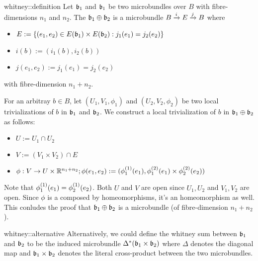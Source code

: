 \begin{mydefinition}{whitney::definition}
    Let $\bb_1$ and $\bb_1$ be two microbundles over $B$ with fibre-dimensions $n_1$ and $n_2$.
    The  $\whitney{\bb_1}{\bb_2}$ is a microbundle $\bundle{B}{E}{i}{j}$ where
    \begin{itemize}
        \item $E := \set{ (e_1, e_2) \in E(\bb_1) \times E(\bb_2)}{j_1(e_1) = j_2(e_2)}$
        \item $i(b) := (i_1(b), i_2(b))$
        \item $j(e_1, e_2) := j_1(e_1) = j_2(e_2)$
    \end{itemize}
    with fibre-dimension $n_1 + n_2$.
\end{mydefinition}

\begin{myproof}
    For an arbitray $b \in B$, let $(U_1, V_1, \phi_1)$ and $(U_2, V_2, \phi_2)$
    be two local trivializations of $b$ in $\bb_1$ and $\bb_2$.
    We construct a local trivialization of $b$ in $\whitney{\bb_1}{\bb_2}$ as follows:
    \begin{itemize}
        \item $U := U_1 \cap U_2$
        \item $V := (V_1 \times V_2) \cap E$
        \item $\phi: V \to U \times \R^{n_1 + n_2}; \phi(e_1, e_2) := (\frst{\phi_1}(e_1), \snd{\phi_1}(e_1) \times  \snd{\phi_2}(e_2))$
    \end{itemize}
    Note that $\frst{\phi_1}(e_1) = \frst{\phi_2}(e_2)$.
    Both $U$ and $V$ are open since $U_1, U_2$ and $V_1, V_2$ are open.
    Since $\phi$ is a composed by homeomorphisms, it's an homeomorphism as well.
    This conludes the proof that $\whitney{\bb_1}{\bb_2}$ is a microbundle (of fibre-dimension $n_1 + n_2$).
\end{myproof}

\begin{myremark}{whitney::alternative}
    Alternatively, we could define the whitney sum between $\bb_1$ and $\bb_2$
    to be the induced microbundle $\ind{\Delta}(\bb_1 \times \bb_2)$
    where $\Delta$ denotes the diagonal map and $\bb_1 \times \bb_2$
    denotes the literal cross-product between the two microbundles.
\end{myremark}